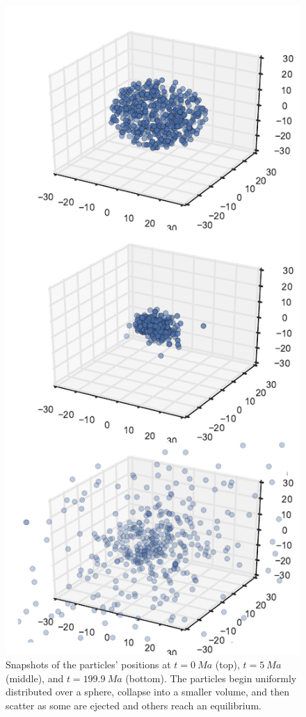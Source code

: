 \documentclass[aps,prc,reprint,floatfix,nobalancelastpage]{revtex4-1}
\begin{document}
    \begin{figure}[p]
        \centering
        \includegraphics{3d.pdf}
        \caption{Snapshots of the particles' positions at $t=\SI{0}{Ma}$ (top), $t=\SI{5}{Ma}$ (middle), and $t=\SI{199.9}{Ma}$ (bottom). The particles begin uniformly distributed over a sphere, collapse into a smaller volume, and then scatter as some are ejected and others reach an equilibrium.}
        \label{fig:3d}
    \end{figure}
\end{document}
